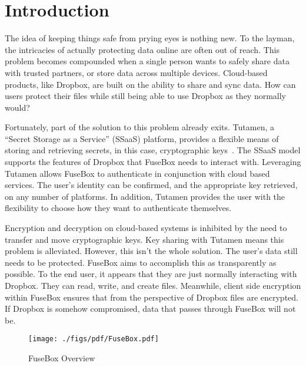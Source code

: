 \documentclass[11pt,twocolumn,letterpaper]{article}
\newcommand{\appname}{FuseBox }
\newcommand{\custos}{Tutamen }
\newcommand{\custosWOspace}{Tutamen}
\begin{document}
\section{Introduction}
\label{sec:intro}
The idea of keeping things safe from prying eyes is nothing new.
To the layman, the intricacies of
actually protecting data online are often out of reach. This problem
becomes compounded when a single person wants to safely share data
with trusted partners, or store data across multiple devices.
Cloud-based products, like Dropbox, are built
on the ability to share and sync data. How can users protect their
files while still being able to use Dropbox as they normally would? 
\par Fortunately, part of the solution to this problem already exits.
\custosWOspace, a ``Secret Storage as a Service'' (SSaaS) platform, 
provides a flexible means of storing and
retrieving secrets, in this case, cryptographic
keys~\cite{custostrios}. 
The SSaaS model supports the features of
Dropbox that \appname needs to interact with. Leveraging \custos allows \appname to 
authenticate in conjunction with cloud based services. The user's
identity can be confirmed, and the appropriate key retrieved, on any number
of platforms. In addition, \custos provides the user with the 
flexibility to choose how they want to authenticate themselves. 
\par Encryption and decryption on cloud-based systems is inhibited by
the need to transfer and move cryptographic keys. Key sharing 
with \custos means this problem is alleviated. However, this isn't the
whole solution. The user's data still needs to be protected.
\appname aims to accomplish this as transparently as
possible. To the end user, it appears that they are just normally
interacting with Dropbox. They can read, write, and create
files. Meanwhile, client side encryption within \appname
ensures that from the perspective of Dropbox files are encrypted.
If Dropbox is somehow compromised, data that passes through \appname
will not be.    

\begin{figure}[htb]
  \centering
  \texttt{[image: ./figs/pdf/FuseBox.pdf]}
  \caption{FuseBox Overview}
  \label{fig:fusebox}
\end{figure}
\end{document}
